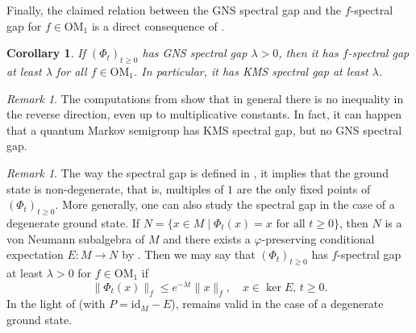 \documentclass[a4paper,12pt]{amsart}
\newcommand{\norm}[1]{\lVert#1\rVert}
\newcommand{\id}{\mathrm{id}}
\newcommand{\OM}{\mathrm{OM}}
\renewcommand{\phi}{\varphi}
\theoremstyle{plain}
\newtheorem{corollary}[proposition]{Corollary}
\theoremstyle{remark}
\newtheorem{remark}[proposition]{Remark}
\theoremstyle{definition}
\begin{document}
Finally, the claimed relation between the GNS spectral gap and the $f$-spectral gap for $f\in\OM_1$ is a direct consequence of .

\begin{corollary}\label{cor:comparison_spectral_gap}
    If $(\Phi_t)_{t\geq 0}$ has GNS spectral gap $\lambda>0$, then it has $f$-spectral gap at least $\lambda$ for all $f\in \OM_1$. In particular, it has KMS spectral gap at least $\lambda$.
\end{corollary}

\begin{remark}
    The computations from \cite[Section 7.1]{FPSU25} show that in general there is no inequality in the reverse direction, even up to multiplicative constants. In fact, it can happen that a quantum Markov semigroup has KMS spectral gap, but no GNS spectral gap.
\end{remark}

\begin{remark}
    The way the spectral gap is defined in \cite{FPSU25}, it implies that the ground state is non-degenerate, that is, multiples of $1$ are the only fixed points of $(\Phi_t)_{t\geq 0}$. More generally, one can also study the spectral gap in the case of a degenerate ground state. If $N=\{x\in M\mid \Phi_t(x)=x\text{ for all }t\geq 0\}$, then $N$ is a von Neumann subalgebra of $M$ and there exists a $\phi$-preserving conditional expectation $E\colon M\to N$ by \cite[Theorem A]{Wat79}. Then we may say that $(\Phi_t)_{t\geq 0}$ has $f$-spectral gap at least $\lambda>0$ for $f\in \OM_1$ if
    \begin{equation*}
        \norm{\Phi_t(x)}_f\leq e^{-\lambda t}\norm{x}_f,\quad x\in \ker E,\,t\geq 0.
    \end{equation*}
    In the light of  (with $P=\id_M-E$),  remains valid in the case of a degenerate ground state.
\end{remark}
\end{document}
